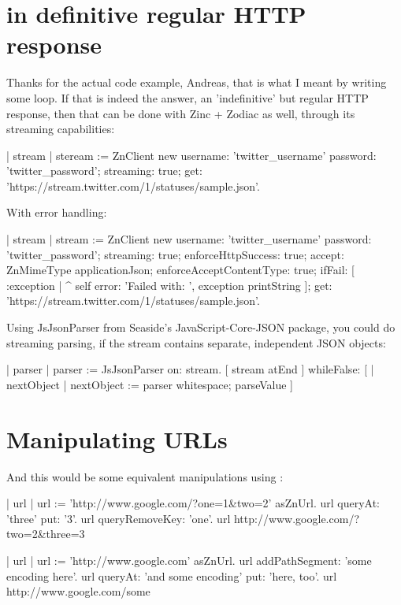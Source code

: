 \documentclass[a4paper,10pt,twoside]{book}
\begin{document}
\section{in definitive regular HTTP response}
Thanks for the actual code example, Andreas, that is what I meant by writing some loop. If that is indeed the answer, an 'indefinitive' but regular HTTP response, then that can be done with Zinc + Zodiac as well, through its streaming capabilities: 

\begin{code}
| stream |
steream := ZnClient new
	username: 'twitter_username' password: 'twitter_password';
	streaming: true;
	get: 'https://stream.twitter.com/1/statuses/sample.json'.
\end{code}

With error handling:

\begin{code}
| stream |
stream := ZnClient new
	username: 'twitter_username' password: 'twitter_password';
	streaming: true;
	enforceHttpSuccess: true; 
	accept: ZnMimeType applicationJson;
	enforceAcceptContentType: true; 
	ifFail: [ :exception | ^ self error: 'Failed with: ', exception printString ]; 
	get: 'https://stream.twitter.com/1/statuses/sample.json'.
\end{code}

Using JsJsonParser from Seaside's JavaScript-Core-JSON package, you could do streaming parsing, if the stream contains separate, independent JSON objects:

\begin{code}
| parser |
parser := JsJsonParser on: stream.
[ stream atEnd ] whileFalse: [ | nextObject |
	nextObject := parser whitespace; parseValue ]
\end{code}





\section{Manipulating URLs}

And this would be some equivalent manipulations using :

\begin{code}{}
| url |
url := 'http://www.google.com/?one=1&two=2' asZnUrl.
url queryAt: 'three' put: '3'.
url queryRemoveKey: 'one'.
url
\returns http://www.google.com/?two=2&three=3
\end{code}

\begin{code}{}
| url |
url := 'http://www.google.com' asZnUrl.
url addPathSegment: 'some encoding here'.
url queryAt: 'and some encoding' put: 'here, too'.
url 
http://www.google.com/some%
\end{code}




\ifx\wholebook\relax\else
\end{document}
